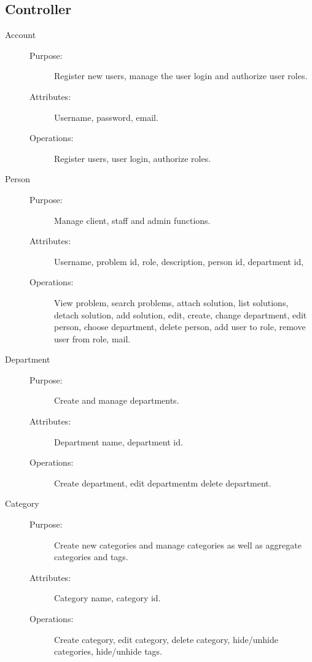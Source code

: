 \subsection{Controller}

\begin{description}
\item[Account]\hfill
\begin{description}
\item[Purpose:]Register new users, manage the user login and authorize user roles.
\item[Attributes:]Username, password, email.
\item[Operations:]Register users, user login, authorize roles.
\end{description}
\end{description}

\begin{description}
\item[Person]\hfill
\begin{description}
\item[Purpose:]Manage client, staff and admin functions.
\item[Attributes:]Username, problem id, role, description, person id, department id, 
\item[Operations:]View problem, search problems, attach solution, list solutions, detach solution, add solution, edit, create, change department, edit person, choose department, delete person, add user to role, remove user from role, mail.
\end{description}
\end{description}

\begin{description}
\item[Department]\hfill
\begin{description}
\item[Purpose:]Create and manage departments.
\item[Attributes:]Department name, department id.
\item[Operations:]Create department, edit departmentm delete department.
\end{description}
\end{description}

\begin{description}
\item[Category]\hfill
\begin{description}
\item[Purpose:]Create new categories and manage categories as well as aggregate categories and tags.
\item[Attributes:]Category name, category id.
\item[Operations:]Create category, edit category, delete category, hide/unhide categories, hide/unhide tags.
\end{description}
\end{description}

